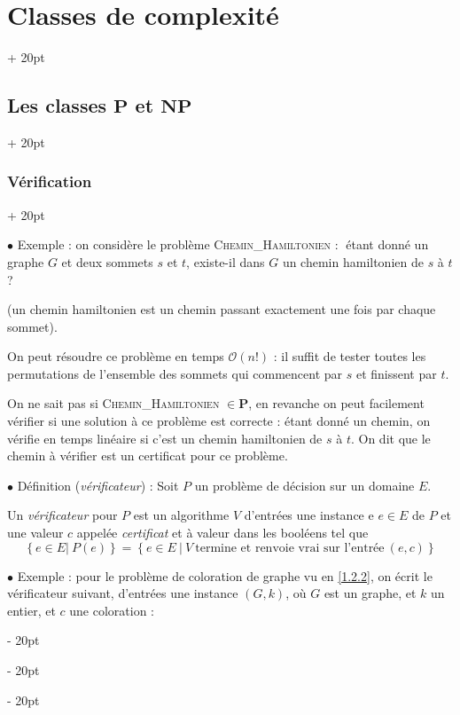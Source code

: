\documentclass[a4paper, 12pt, twoside]{article}
\newenvironment{indalgo}[2][H]{
    \begin{algoBox}
        \begin{algorithm}[#1]
            \caption{#2}
}
{
        \end{algorithm}
    \end{algoBox}
}
\newcommand{\set}[1]{\left\{ #1 \right\}}
\newcommand{\simplecit}[1]{\guillemotleft$\;$#1$\;$\guillemotright}
\newcommand{\ind}[1][20pt]{\advance\leftskip + #1}
\newcommand{\deind}[1][20pt]{\advance\leftskip - #1}
\newenvironment{indt}[2][20pt]{#2 \par \ind[#1]}{\par \deind} %
\begin{document}
\begin{indt}{\section{Classes de complexité}}
\begin{indt}{\subsection{Les classes $\mathbf P$ et $\mathbf{NP}$}}
            \vspace{12pt}
            
            \begin{indt}{\subsubsection{Vérification}}
                \label{2.2.2}

                $\bullet$ Exemple : on considère le problème \textsc{Chemin\_Hamiltonien} : \simplecit{étant donné un graphe $G$ et deux sommets $s$ et $t$, existe-il dans $G$ un chemin hamiltonien de $s$ à $t$ ?}

                (un chemin hamiltonien est un chemin passant exactement une fois par chaque sommet).

                On peut résoudre ce problème en temps $\mathcal O(n!)$ : il suffit de tester toutes les permutations de l'ensemble des sommets qui commencent par $s$ et finissent par $t$.

                On ne sait pas si \textsc{Chemin\_Hamiltonien} $\in \mathbf P$, en revanche on peut facilement vérifier si une solution à ce problème est correcte : étant donné un chemin, on vérifie en temps linéaire si c'est un chemin hamiltonien de $s$ à $t$.
                On dit que le chemin à vérifier est un certificat pour ce problème.

                \vspace{12pt}
                
                $\bullet$ Définition (\emph{vérificateur}) :
                Soit $P$ un problème de décision sur un domaine $E$.

                Un \emph{vérificateur} pour $P$ est un algorithme $V$ d'entrées une instance e $e \in E$ de $P$ et une valeur $c$ appelée \emph{certificat} et à valeur dans les booléens tel que
                \[
                    \set{e \in E |\ P(e)}
                    = \set{e \in E \ |\ V\ \text{termine et renvoie vrai sur l'entrée}\ (e, c)}
                \]

                \vspace{12pt}
                
                $\bullet$ Exemple : pour le problème de coloration de graphe vu en \ref{1.2.2}, on écrit le vérificateur suivant, d'entrées une instance $(G, k)$, où $G$ est un graphe, et $k$ un entier, et $c$ une coloration :

                \begin{indalgo}{Vérificateur du problème de coloration}


\end{indalgo}
\end{indt}
\end{indt}
\end{indt}
\end{document}
